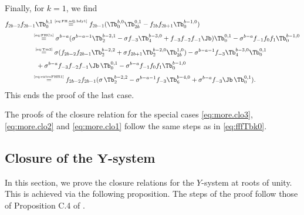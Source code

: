 \documentclass[11pt]{article}
\numberwithin{equation}{section}
\theoremstyle{plain}
\numberwithin{equation}{section}
\begin{document}
Finally, for $k=1$, we find
\begin{alignat}{2}
f_{2b-2}f_{2b-1} \Tb^{b,1}_0 &\overset{\textrm{\tiny\eqref{eq:FH.adj.bdy1}}}{=} f_{2b-1} (\Tb^{b,0}_0 \Tb^{0,1}_{2b}- f_{2b}f_{2b+1}\Tb^{b-1,0}_0)
\nonumber\\[0.1cm]
&\hspace{-1.1cm}\overset{\textrm{\tiny\eqref{eq:FHCa}}}{=} \sigma^{b-a}(\sigma^{b-a-1}\Tb^{b-2,1}_2 - \sigma f_{-3}\Tb^{b-3,0}_4 + f_{-3}f_{-2}f_{-1}\Jb) \Tb^{0,1}_0 - \sigma^{b-a}f_{-1}f_0f_1 \Tb^{b-1,0}_0
\nonumber\\[0.1cm]
&\hspace{-1.03cm}\overset{\textrm{\tiny\eqref{eq:Tm2}}}{=} \sigma(f_{2b-2} f_{2b-1}\Tb^{b-2,2}_2 + \sigma f_{2b+1} \Tb^{b-2,0}_2 \Tb^{1,0}_{2b}) - \sigma^{b-a-1} f_{-3} \Tb^{b-3,0}_4 \Tb^{0,1}_0 
\nonumber\\[0.1cm]
&\hspace{-0.875cm} + \sigma^{b-a} f_{-3}f_{-2}f_{-1}\Jb\, \Tb^{0,1}_0 - \sigma^{b-a}f_{-1}f_0f_1 \Tb^{b-1,0}_0 
\nonumber\\[0.1cm]
&\hspace{-1.1cm}\overset{\textrm{\tiny\eqref{eq:extraFHR1}}}{=} f_{2b-2}f_{2b-1}(\sigma\, \Tb^{b-2,2}_2 - \sigma^{b-a-1}f_{-3}\Tb^{b-4,0}_6 + \sigma^{b-a}f_{-3}\Jb\,\Tb^{0,1}_0).
\end{alignat}
%
This ends the proof of the last case.
\eproof

\noindent The proofs of the closure relation for the special cases \eqref{eq:more.clo3}, \eqref{eq:more.clo2} and \eqref{eq:more.clo1} follow the same steps as in \eqref{eq:fffTbk0}.

\subsection[Closure of the $Y$-system]{Closure of the $\boldsymbol Y$-system}\label{sec:Y.closure}
In this section, we prove the closure relations for the $Y$-system at roots of unity. This is achieved via the following proposition. The steps of the proof follow those of Proposition C.4 of \cite{MDPR2018}.
\end{document}
